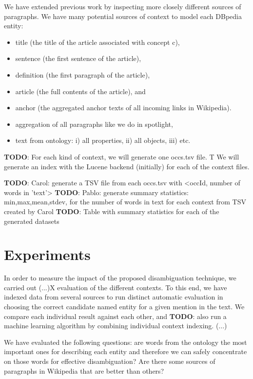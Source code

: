 \documentclass[10pt,a4paper]{article}
\newcommand{\todo}[1]{{\color{red}\textsf{\textbf{TODO}}: #1}}
\begin{document}
We have extended previous work by inspecting more closely different sources of paragraphs.
We have many potential sources of context to model each DBpedia entity:
\begin{itemize}
\item title (the title of the article associated with concept c), 
\item sentence (the first sentence of the article),
\item definition (the first paragraph of the article), 
\item article (the full contents of the article), and 
\item anchor (the aggregated anchor texts of all incoming links in Wikipedia).
\item aggregation of all paragraphs like we do in spotlight,
\item text from ontology: i) all properties, ii) all objects, iii) etc.
\end{itemize}

\todo{For each kind of context, we will generate one occs.tsv file. T
We will generate an index with the Lucene backend (initially) for each of the context files. }

\todo{Carol: generate a TSV file from each occs.tsv with <occId, number of words in 'text'>}
\todo{Pablo: generate summary statistics: min,max,mean,stdev, for the number of words in text for each context from TSV created by Carol}
\todo{Table with summary statistics for each of the generated datasets}



\section{Experiments}

In order to measure the impact of the proposed disambiguation technique, we carried out  (...)X evaluation of the different contexts. To this end, we have indexed data from several sources to run distinct automatic evaluation in choosing the correct candidate named entity for a given mention in the text. We compare each individual result against each other, and \todo{also run a machine learning algorithm by combining individual context indexing. (...) }

We have evaluated the following questions: are words from the ontology the most important ones for describing each entity and therefore we can safely concentrate on those words for effective disambiguation? Are there some sources of paragraphs in Wikipedia that are better than others?
\end{document}
